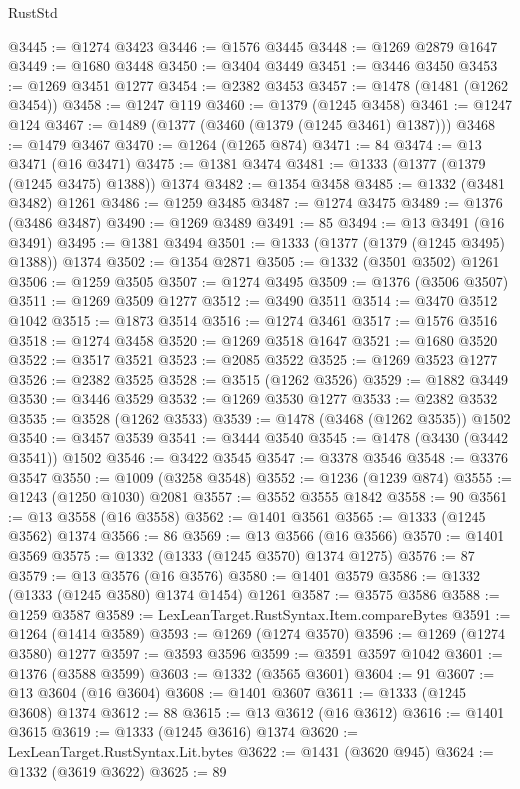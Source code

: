 \begin{lexlean}{RustStd}
\begin{coremodule}
{\begin{coremodule}
{{{{{{{{{{{{{{{{{{{{{{{{{{{{{{{{{{{@3445 := @1274 @3423
@3446 := @1576 @3445
@3448 := @1269 @2879 @1647
@3449 := @1680 @3448
@3450 := @3404 @3449
@3451 := @3446 @3450
@3453 := @1269 @3451 @1277
@3454 := @2382 @3453
@3457 := @1478 (@1481 (@1262 @3454))
@3458 := @1247 @119
@3460 := @1379 (@1245 @3458)
@3461 := @1247 @124
@3467 := @1489 (@1377 (@3460 (@1379 (@1245 @3461) @1387)))
@3468 := @1479 @3467
@3470 := @1264 (@1265 @874)
@3471 := 84
@3474 := @13 @3471 (@16 @3471)
@3475 := @1381 @3474
@3481 := @1333 (@1377 (@1379 (@1245 @3475) @1388)) @1374
@3482 := @1354 @3458
@3485 := @1332 (@3481 @3482) @1261
@3486 := @1259 @3485
@3487 := @1274 @3475
@3489 := @1376 (@3486 @3487)
@3490 := @1269 @3489
@3491 := 85
@3494 := @13 @3491 (@16 @3491)
@3495 := @1381 @3494
@3501 := @1333 (@1377 (@1379 (@1245 @3495) @1388)) @1374
@3502 := @1354 @2871
@3505 := @1332 (@3501 @3502) @1261
@3506 := @1259 @3505
@3507 := @1274 @3495
@3509 := @1376 (@3506 @3507)
@3511 := @1269 @3509 @1277
@3512 := @3490 @3511
@3514 := @3470 @3512 @1042
@3515 := @1873 @3514
@3516 := @1274 @3461
@3517 := @1576 @3516
@3518 := @1274 @3458
@3520 := @1269 @3518 @1647
@3521 := @1680 @3520
@3522 := @3517 @3521
@3523 := @2085 @3522
@3525 := @1269 @3523 @1277
@3526 := @2382 @3525
@3528 := @3515 (@1262 @3526)
@3529 := @1882 @3449
@3530 := @3446 @3529
@3532 := @1269 @3530 @1277
@3533 := @2382 @3532
@3535 := @3528 (@1262 @3533)
@3539 := @1478 (@3468 (@1262 @3535)) @1502
@3540 := @3457 @3539
@3541 := @3444 @3540
@3545 := @1478 (@3430 (@3442 @3541)) @1502
@3546 := @3422 @3545
@3547 := @3378 @3546
@3548 := @3376 @3547
@3550 := @1009 (@3258 @3548)
@3552 := @1236 (@1239 @874)
@3555 := @1243 (@1250 @1030) @2081
@3557 := @3552 @3555 @1842
@3558 := 90
@3561 := @13 @3558 (@16 @3558)
@3562 := @1401 @3561
@3565 := @1333 (@1245 @3562) @1374
@3566 := 86
@3569 := @13 @3566 (@16 @3566)
@3570 := @1401 @3569
@3575 := @1332 (@1333 (@1245 @3570) @1374 @1275)
@3576 := 87
@3579 := @13 @3576 (@16 @3576)
@3580 := @1401 @3579
@3586 := @1332 (@1333 (@1245 @3580) @1374 @1454) @1261
@3587 := @3575 @3586
@3588 := @1259 @3587
@3589 := LexLeanTarget.RustSyntax.Item.compareBytes
@3591 := @1264 (@1414 @3589)
@3593 := @1269 (@1274 @3570)
@3596 := @1269 (@1274 @3580) @1277
@3597 := @3593 @3596
@3599 := @3591 @3597 @1042
@3601 := @1376 (@3588 @3599)
@3603 := @1332 (@3565 @3601)
@3604 := 91
@3607 := @13 @3604 (@16 @3604)
@3608 := @1401 @3607
@3611 := @1333 (@1245 @3608) @1374
@3612 := 88
@3615 := @13 @3612 (@16 @3612)
@3616 := @1401 @3615
@3619 := @1333 (@1245 @3616) @1374
@3620 := LexLeanTarget.RustSyntax.Lit.bytes
@3622 := @1431 (@3620 @945)
@3624 := @1332 (@3619 @3622)
@3625 := 89
}}}}}}}}}}}}}}}}}}}}}}}}}}}}}}}}}}}
\end{coremodule}}
\end{coremodule}
\end{lexlean}
